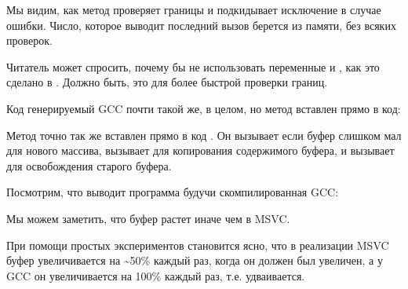 

Мы видим, как метод  проверяет границы и подкидывает исключение в случае ошибки.
Число, которое выводит последний вызов \printf берется из памяти, без всяких
проверок.

Читатель может спросить, почему бы не использовать переменные  и , 
как это сделано в .
Должно быть, это для более быстрой проверки границ.

Код генерируемый GCC почти такой же, в целом, но метод  вставлен прямо в код:



Метод  точно так же вставлен прямо в код \main.
Он вызывает  если буфер слишком мал для нового массива, вызывает  
для копирования содержимого буфера,
и вызывает  для освобождения старого буфера.

Посмотрим, что выводит программа будучи скомпилированная GCC:



Мы можем заметить, что буфер растет иначе чем в MSVC.

При помощи простых экспериментов становится ясно, что в реализации MSVC буфер увеличивается
на \textasciitilde{}50\% каждый раз,
когда он должен был увеличен,
а у GCC он увеличивается на 100\% каждый раз, т.е. удваивается.


